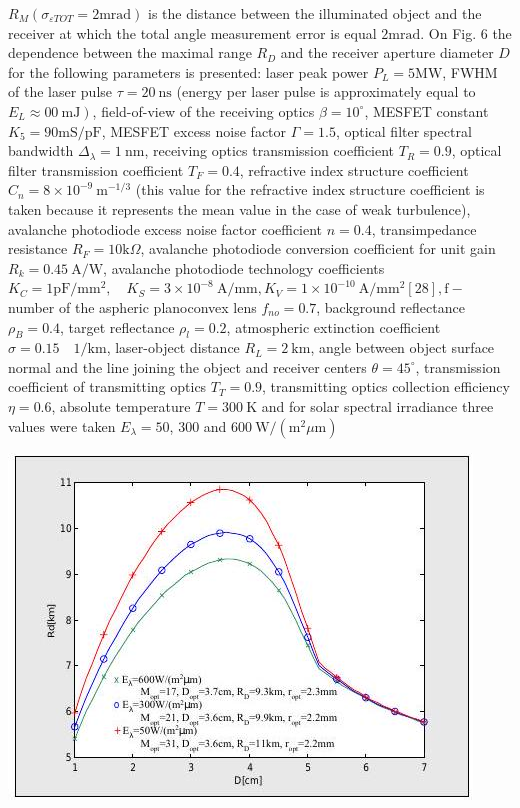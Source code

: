 \documentclass[10pt]{article}
\begin{document}
\(R_{M}\left(\sigma_{\varepsilon TOT}=2 \mathrm{mrad}\right)\) is the distance between the illuminated object and the receiver at which the total angle measurement error is equal \(2 \mathrm{mrad}\). On Fig. 6 the dependence between the maximal range \(R_{D}\) and the receiver aperture diameter \(D\) for the following parameters is presented: laser peak power \(P_{L}=5 \mathrm{MW}\), FWHM of the laser pulse \(\tau=20 \mathrm{~ns}\) (energy per laser pulse is approximately equal to \(\left.E_{L} \approx 00 \mathrm{~mJ}\right)\), field-of-view of the receiving optics \(\beta=10^{\circ}\), MESFET constant \(K_{5}=90 \mathrm{mS} / \mathrm{pF}\), MESFET excess noise factor \(\Gamma=1.5\), optical filter spectral bandwidth \(\Delta_{\lambda}=1 \mathrm{~nm}\), receiving optics transmission coefficient \(T_{R}=0.9\), optical filter transmission coefficient \(T_{F}=0.4\), refractive index structure coefficient \(C_{n}=8 \times 10^{-9} \mathrm{~m}^{-1 / 3}\) (this value for the refractive index structure coefficient is taken because it represents the mean value in the case of weak turbulence), avalanche photodiode excess noise factor coefficient \(n=0.4\), transimpedance resistance \(R_{F}=10 \mathrm{k} \Omega\), avalanche photodiode conversion coefficient for unit gain \(R_{k}=0.45 \mathrm{~A} / \mathrm{W}\), avalanche photodiode technology coefficients \(K_{C}=1 \mathrm{pF} / \mathrm{mm}^{2}, \quad K_{S}=3 \times 10^{-8} \mathrm{~A} / \mathrm{mm}, K_{V}=1 \times 10^{-10} \mathrm{~A} / \mathrm{mm}^{2}[28], \mathrm{f}-\) number of the aspheric planoconvex lens \(f_{n o}=0.7\), background reflectance \(\rho_{B}=0.4\), target reflectance \(\rho_{l}=0.2\), atmospheric extinction coefficient \(\sigma=0.15 \quad 1 / \mathrm{km}\), laser-object distance \(R_{L}=2 \mathrm{~km}\), angle between object surface normal and the line joining the object and receiver centers \(\theta=45^{\circ}\), transmission coefficient of transmitting optics \(T_{T}=0.9\), transmitting optics collection efficiency \(\eta=0.6\), absolute temperature \(T=300 \mathrm{~K}\) and for solar spectral irradiance three values were taken \(E_{\lambda}=50\), 300 and \(600 \mathrm{~W} /\left(\mathrm{m}^{2} \mu \mathrm{m}\right)\)

\includegraphics[max width=\textwidth]{d2750892714501b765cfde22b041f38a-09}
\end{document}

